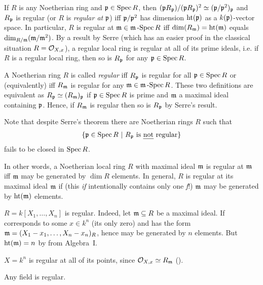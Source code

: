 \documentclass[a4paper,parskip=half,numbers=enddot, DIV=12]{scrreprt}
\begin{document}
\begin{rem}
    If $R$ is any Noetherian ring and $\mathfrak{p}\in \operatorname{Spec} R$, then $(\mathfrak{p} R_{\mathfrak{p}})/(\mathfrak{p} R_{\mathfrak{p}})^2 \simeq (\mathfrak{p}/\mathfrak{p}^2)_{\mathfrak{p}}$ and $R_{\mathfrak{p}}$ is regular (or $R$ is \emph{regular at} $\mathfrak{p}$) iff $\mathfrak{p}/\mathfrak{p}^2$ has dimension $\operatorname{ht}(\mathfrak{p})$ as a $k(\mathfrak{p})$-vector space. In particular, $R$ is regular at $\mathfrak{m}\in\mathfrak{m}\operatorname{-Spec} R$ iff $\dim(R_{\mathfrak{m}}) = \operatorname{ht}(\mathfrak{m})$ equals $\dim_{R/\mathfrak{m}} (\mathfrak{m}/\mathfrak{m}^2)$. By a result by Serre (which has an easier proof in the classical situation $R=\mathcal{O}_{X,x}$), a regular local ring is regular at all of its prime ideals, i.e. if $R$ is a regular local ring, then so is $R_{\mathfrak{p}}$ for any $\mathfrak{p}\in \operatorname{Spec} R$. 
    
    A Noetherian ring $R$ is called \emph{regular} iff $R_{\mathfrak{p}}$ is regular for all $\mathfrak{p}\in\operatorname{Spec} R$ or (equivalently) iff $R_{\mathfrak{m}}$ is regular for any $\mathfrak{m}\in\mathfrak{m}\operatorname{-Spec} R$. These two definitions are equivalent as $R_{\mathfrak{p}}\simeq (R_{\mathfrak{m}})_{\mathfrak{p}}$ if $\mathfrak{p}\in\operatorname{Spec} R$ is prime and $\mathfrak{m}$ a maximal ideal containing $\mathfrak{p}$. Hence, if $R_{\mathfrak{m}}$ is regular then so is $R_{\mathfrak{p}}$ by Serre's result. 
    
    Note that despite Serre's theorem there are Noetherian rings $R$ such that 
    \begin{align*}
    	\left\{\mathfrak{p}\in\operatorname{Spec} R\ \middle|\  R_{\mathfrak{p}}\text{ is \emph{not} regular}\right\}
    \end{align*}
    fails to be closed in $\operatorname{Spec} R$.
\end{rem}
\begin{rem*}
    In other words, a Noetherian local ring $R$ with maximal ideal $\mathfrak{m}$ is regular at $\mathfrak{m}$ iff $\mathfrak{m}$ may be generated by $\dim R$ elements. In general, $R$ is regular at its maximal ideal $\mathfrak{m}$ if (this \emph{if} intentionally contains only one \emph{f}!) $\mathfrak{m}$ may be generated by $\operatorname{ht}(\mathfrak{m})$ elements.
\end{rem*}
\begin{example*}
    \begin{alphanumerate}
        \item 
            $R= k[X_1,\ldots,X_n]$ is regular. Indeed, let $\mathfrak{m}\subseteq R$ be a maximal ideal. If corresponds to some $x\in k^n$ (its only zero) and has the form $\mathfrak{m} = ( X_1-x_1,\ldots, X_n-x_n)_R$, hence may be generated by $n$ elements. But $\operatorname{ht}(\mathfrak{m}) = n$ by \cite[Theorem~10]{alg1} from Algebra~I.
        \item 
            $X=k^n$ is regular at all of its points, since $\mathcal{O}_{X,x} \simeq R_{\mathfrak{m}}$ (\cite[Proposition~2.3.4]{alg1}).
        \item 
            Any field is regular.
    \end{alphanumerate}
\end{example*}
\end{document}
